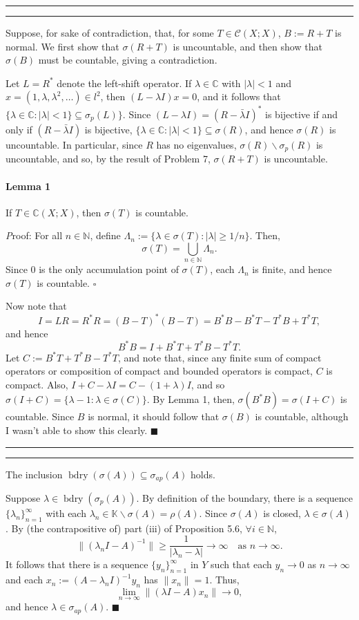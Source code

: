 \documentclass[11pt]{article}
\newcounter{questionCounter}
\newcounter{partCounter}[questionCounter]
\newenvironment{question}[2][\arabic{questionCounter}]{%
    \setcounter{partCounter}{0}%
    \vspace{.25in} \hrule \vspace{0.5em}%
        \noindent{\bf #2}%
    \vspace{0.8em} \hrule \vspace{.10in}%
    \addtocounter{questionCounter}{1}%
}{}
\renewcommand{\qed}{\quad \ensuremath{\blacksquare}}
\newcommand{\inv}{^{-1}}
\newcommand{\bdry}{\operatorname{bdry}} %
\newcommand{\sminus}{\backslash}        %
\newcommand{\N}{\mathbb{N}}             %
\newcommand{\C}{\mathbb{C}}             %
\newcommand{\Cmp}{\mathcal{C}}          %
\newcommand{\K}{\mathbb{K}}             %
\begin{document}
\newpage
\begin{question}{Problem 8}
Suppose, for sake of contradiction, that, for some $T \in \Cmp(X;X)$,
$B := R + T$ is normal. We first show that $\sigma(R + T)$ is uncountable, and
then show that $\sigma(B)$ must be countable, giving a contradiction.

Let $L = R^*$ denote the left-shift operator. If $\lambda \in \C$ with
$|\lambda| < 1$ and $x = (1,\lambda,\lambda^2,\ldots) \in l^2$, then
$(L - \lambda I)x = 0$, and it follows that
$\{\lambda \in \C : |\lambda| < 1\} \subseteq \sigma_p(L)\}$. Since
$(L - \lambda I) = (R - \bar{\lambda} I)^*$ is bijective if and only if
$(R - \bar{\lambda} I)$ is bijective,
$\{\lambda \in \C : |\lambda| < 1\} \subseteq \sigma(R)$, and hence
$\sigma(R)$ is uncountable. In particular, since $R$ has no eigenvalues,
$\sigma(R)\sminus\sigma_p(R)$ is uncountable, and so, by the result of Problem
7, $\sigma(R + T)$ is uncountable.

\paragraph{Lemma 1} If $T \in \C(X;X)$, then $\sigma(T)$ is countable.

{\emph Proof:} For all $n \in \N$, define
$\Lambda_n := \{\lambda \in \sigma(T) : |\lambda| \geq 1/n\}$. Then,
\[\sigma(T) = \bigcup_{n \in \N} \Lambda_n.\]
Since $0$ is the only accumulation point of $\sigma(T)$, each $\Lambda_n$ is
finite, and hence $\sigma(T)$ is countable. $\square$

Now note that
\[I = LR = R^*R = (B - T)^*(B - T) = B^*B - B^*T - T^*B + T^*T,\]
and hence
\[B^*B = I + B^*T + T^*B - T^*T.\]
Let $C := B^*T + T^*B - T^*T$, and note that, since any finite sum of compact
operators or composition of compact and bounded operators is compact, $C$ is
compact. Also, $I + C - \lambda I = C - (1 + \lambda)I$, and so
$\sigma(I + C) = \{\lambda - 1 : \lambda \in \sigma(C)\}$. By Lemma 1, then,
$\sigma(B^*B) = \sigma(I + C)$ is countable. Since $B$ is normal, it should
follow that $\sigma(B)$ is countable, although I wasn't able to show this
clearly. \qed
\end{question}

\begin{question}{Problem 11}
The inclusion $\bdry(\sigma(A)) \subseteq \sigma_{ap}(A)$ holds.

Suppose $\lambda \in \bdry(\sigma_p(A))$. By definition of the
boundary, there is a sequence $\{\lambda_n\}_{n = 1}^\infty$ with each
$\lambda_n \in \K \sminus \sigma(A) = \rho(A)$. Since $\sigma(A)$ is closed,
$\lambda \in \sigma(A)$. By (the contrapositive of) part (iii) of
Proposition 5.6, $\forall i \in \N$,
\[\|(\lambda_n I - A)\inv\| \geq \frac{1}{|\lambda_n - \lambda|} \to \infty
\quad \mbox{as } n \to \infty.\]
It follows that there is a sequence $\{y_n\}_{n = 1}^\infty$ in $Y$ such that
each $y_n \to 0$ as $n \to \infty$ and each
$x_n := (A - \lambda_n I)\inv y_n$ has $\|x_n\| = 1$. Thus,
\[\lim_{n \to \infty} \|(\lambda I - A) x_n\| \to 0,\]
and hence $\lambda \in \sigma_{ap}(A)$. \qed
\end{question}
\end{document}
